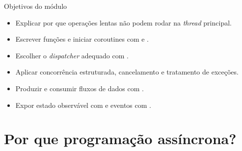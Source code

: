 \documentclass[aspectratio=169,10pt]{beamer}
\begin{document}
\capa

\begin{frame}{Objetivos do módulo}
  \begin{conceito}
    \begin{itemize}
      \item Explicar por que operações lentas não podem rodar na \emph{thread} principal.
      \item Escrever funções  e iniciar coroutines com  e .
      \item Escolher o \emph{dispatcher} adequado com .
      \item Aplicar concorrência estruturada, cancelamento e tratamento de exceções.
      \item Produzir e consumir fluxos de dados com .
      \item Expor estado observável com  e eventos com .
    \end{itemize}
  \end{conceito}
\end{frame}

\sumario

\section{Por que programação assíncrona?}
\end{document}
